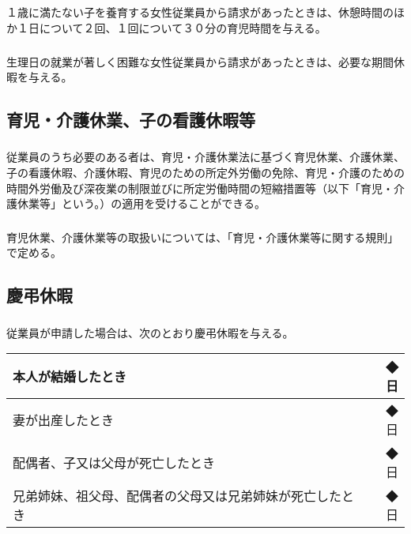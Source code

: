 \documentclass{jsarticle}
\begin{document}
\subsection{}
\label{就規_条_育児時間及び生理休暇}
\subsubsection{}
\label{就規_項_育児時間}
１歳に満たない子を養育する女性従業員から請求があったときは、休憩時間のほか１日について２回、１回について３０分の育児時間を与える。
\subsubsection{}
\label{就規_項_生理休暇}
生理日の就業が著しく困難な女性従業員から請求があったときは、必要な期間休暇を与える。

\subsection{育児・介護休業、子の看護休暇等}
\label{就規_条_育児・介護休業、子の看護休暇等}
\subsubsection{}
\label{就規_項_育児・介護休業、子の看護休暇等}
従業員のうち必要のある者は、育児・介護休業法に基づく育児休業、介護休業、子の看護休暇、介護休暇、育児のための所定外労働の免除、育児・介護のための時間外労働及び深夜業の制限並びに所定労働時間の短縮措置等（以下「育児・介護休業等」という。）の適用を受けることができる。
\subsubsection{}
\label{就規_項_育児・介護休業、子の看護休暇等の取扱}
育児休業、介護休業等の取扱いについては、「育児・介護休業等に関する規則」で定める。

\subsection{慶弔休暇}
\label{就規_条_慶弔休暇}
\subsubsection{}
\label{就規_項_慶弔休暇}
従業員が申請した場合は、次のとおり慶弔休暇を与える。
  \begin{table}[htb]
    \centering
    \begin{tabular}{|l|r|} \hline
      本人が結婚したとき & ◆日 \\ \hline
      妻が出産したとき & ◆日 \\ \hline
      配偶者、子又は父母が死亡したとき & ◆日 \\ \hline
      兄弟姉妹、祖父母、配偶者の父母又は兄弟姉妹が死亡したとき & ◆日 \\ \hline
    \end{tabular}
  \end{table}
\end{document}
